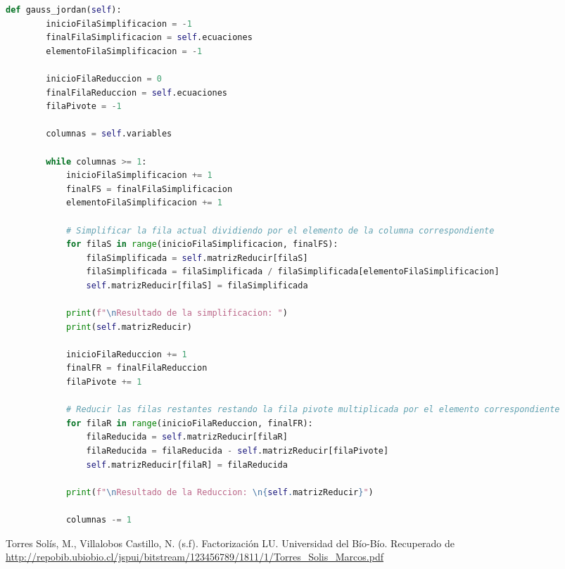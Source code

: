 \documentclass[letterpaper,12pt]{article}
\begin{document}
\begin{lstlisting}[style=jupyter, language=Python, caption={Método para resolver el sistema de ecuaciones}]
    def gauss_jordan(self):
        inicioFilaSimplificacion = -1
        finalFilaSimplificacion = self.ecuaciones
        elementoFilaSimplificacion = -1

        inicioFilaReduccion = 0
        finalFilaReduccion = self.ecuaciones
        filaPivote = -1

        columnas = self.variables

        while columnas >= 1:
            inicioFilaSimplificacion += 1
            finalFS = finalFilaSimplificacion
            elementoFilaSimplificacion += 1

            # Simplificar la fila actual dividiendo por el elemento de la columna correspondiente
            for filaS in range(inicioFilaSimplificacion, finalFS):
                filaSimplificada = self.matrizReducir[filaS]
                filaSimplificada = filaSimplificada / filaSimplificada[elementoFilaSimplificacion]
                self.matrizReducir[filaS] = filaSimplificada

            print(f"\nResultado de la simplificacion: ")
            print(self.matrizReducir)

            inicioFilaReduccion += 1
            finalFR = finalFilaReduccion
            filaPivote += 1

            # Reducir las filas restantes restando la fila pivote multiplicada por el elemento correspondiente
            for filaR in range(inicioFilaReduccion, finalFR):
                filaReducida = self.matrizReducir[filaR]
                filaReducida = filaReducida - self.matrizReducir[filaPivote]
                self.matrizReducir[filaR] = filaReducida

            print(f"\nResultado de la Reduccion: \n{self.matrizReducir}")

            columnas -= 1

\end{lstlisting}

\begin{thebibliography}{99}
Torres Solís, M., Villalobos Castillo, N. (s.f). Factorización LU. Universidad del Bío-Bío. Recuperado de \url{http://repobib.ubiobio.cl/jspui/bitstream/123456789/1811/1/Torres_Solis_Marcos.pdf}
\end{thebibliography}
\end{document}
